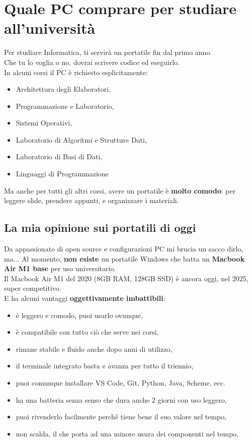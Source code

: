 \documentclass[18pt]{extarticle}
\begin{document}
\section{Quale PC comprare per studiare all’università}
Per studiare Informatica, ti servirà un portatile fin dal primo anno.\\
Che tu lo voglia o no, dovrai scrivere codice ed eseguirlo.\\
In alcuni corsi il PC è richiesto esplicitamente:
\begin{itemize}
\item Architettura degli Elaboratori,
\item Programmazione e Laboratorio,
\item Sistemi Operativi,
\item Laboratorio di Algoritmi e Strutture Dati,
\item Laboratorio di Basi di Dati,
\item Linguaggi di Programmazione
\end{itemize}
Ma anche per tutti gli altri corsi, avere un portatile è \textbf{molto comodo}: per leggere slide, prendere appunti, e organizzare i materiali.


\subsection{La mia opinione sui portatili di oggi}
Da appassionato di open source e configurazioni PC mi brucia un sacco dirlo, ma...
Al momento, \textbf{non esiste} un portatile Windows che batta un \textbf{Macbook Air M1 base} per uso universitario.\\
Il Macbook Air M1 del 2020 (8GB RAM, 128GB SSD) è ancora oggi, nel 2025, super competitivo.\\
E ha alcuni vantaggi \textbf{oggettivamente imbattibili}:
\begin{itemize}
\item è leggero e comodo, puoi usarlo ovunque,
\item è compatibile con tutto ciò che serve nei corsi,
\item rimane stabile e fluido anche dopo anni di utilizzo,
\item il terminale integrato basta e avanza per tutto il triennio,
\item puoi comunque installare VS Code, Git, Python, Java, Scheme, ecc.
\item ha una batteria senza senso che dura anche 2 giorni con uso leggero,
\item puoi rivenderlo facilmente perché tiene bene il suo valore nel tempo,
\item non scalda, il che porta ad una minore usura dei componenti nel tempo.
\end{itemize}
\end{document}
